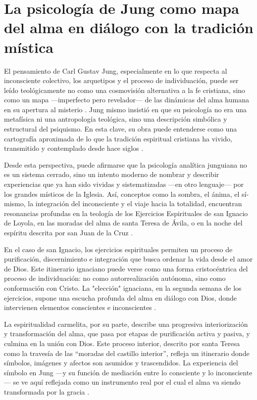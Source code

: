 \section*{La psicología de Jung como mapa del alma en diálogo con la tradición mística}

El pensamiento de Carl Gustav Jung, especialmente en lo que respecta al inconsciente colectivo, los arquetipos y el proceso de individuación, puede ser leído teológicamente no como una cosmovisión alternativa a la fe cristiana, sino como un mapa —imperfecto pero revelador— de las dinámicas del alma humana en su apertura al misterio \cite{jung1959,jung1971}. Jung mismo insistió en que su psicología no era una metafísica ni una antropología teológica, sino una descripción simbólica y estructural del psiquismo. En esta clave, su obra puede entenderse como una cartografía aproximada de lo que la tradición espiritual cristiana ha vivido, transmitido y contemplado desde hace siglos \cite{jung1959}.

Desde esta perspectiva, puede afirmarse que la psicología analítica junguiana no es un sistema cerrado, sino un intento moderno de nombrar y describir experiencias que ya han sido vividas y sistematizadas —en otro lenguaje— por los grandes místicos de la Iglesia. Así, conceptos como la sombra, el ánima, el sí-mismo, la integración del inconsciente y el viaje hacia la totalidad, encuentran resonancias profundas en la teología de los Ejercicios Espirituales de san Ignacio de Loyola, en las moradas del alma de santa Teresa de Ávila, o en la noche del espíritu descrita por san Juan de la Cruz \cite{jung1959,jung1971}.

En el caso de san Ignacio, los ejercicios espirituales permiten un proceso de purificación, discernimiento e integración que busca ordenar la vida desde el amor de Dios. Este itinerario ignaciano puede verse como una forma cristocéntrica del proceso de individuación: no como autorrealización autónoma, sino como conformación con Cristo. La "elección" ignaciana, en la segunda semana de los ejercicios, supone una escucha profunda del alma en diálogo con Dios, donde intervienen elementos conscientes e inconscientes \cite{jung1959,jung1971}.

La espiritualidad carmelita, por su parte, describe una progresiva interiorización y transformación del alma, que pasa por etapas de purificación activa y pasiva, y culmina en la unión con Dios. Este proceso interior, descrito por santa Teresa como la travesía de las “moradas del castillo interior”, refleja un itinerario donde símbolos, imágenes y afectos son asumidos y trascendidos. La experiencia del símbolo en Jung —y su función de mediación entre lo consciente y lo inconsciente— se ve aquí reflejada como un instrumento real por el cual el alma va siendo transformada por la gracia \cite{jung1964}.

